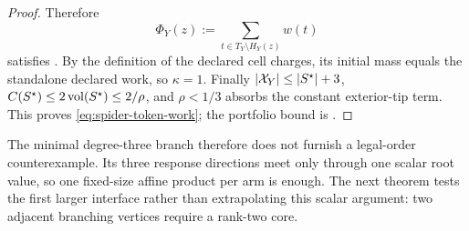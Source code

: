 \begin{proof}
Therefore
\begin{equation*}
 \Phi_Y(z):=\sum_{t\in T_Y\setminus H_Y(z)}w(t)
\end{equation*}
satisfies .  By the definition of the
declared cell charges, its initial mass equals the standalone declared work,
so $\kappa=1$.  Finally $\left\lvert \mathcal X_Y \right\rvert\leq\left\lvert S^\star \right\rvert+3$,
$C(S^\star)\leq2\operatorname{vol}(S^\star)\leq2/\rho$, and $\rho<1/3$ absorbs the constant
exterior-tip term.  This proves \cref{eq:spider-token-work}; the portfolio
bound is .
\end{proof}

The minimal degree-three branch therefore does not furnish a legal-order
counterexample.  Its three response directions meet only through one scalar
root value, so one fixed-size affine product per arm is enough.  The next
theorem tests the first larger interface rather than extrapolating this scalar
argument: two adjacent branching vertices require a rank-two core.

